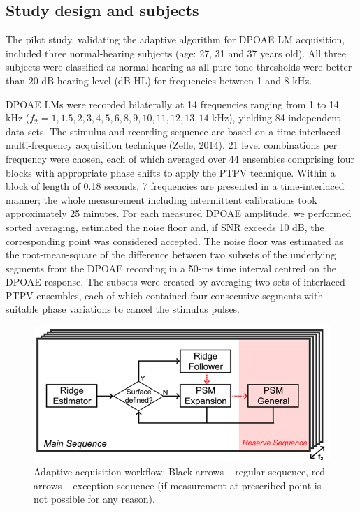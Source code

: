\documentclass[journal,twoside,web]{ieeecolor2}
\begin{document}
\subsection{Study design and subjects}

The pilot study, validating the adaptive algorithm for DPOAE LM acquisition, included three normal-hearing subjects (age: 27, 31 and 37 years old).
All three subjects were classified as normal-hearing as all pure-tone thresholds were better than $20$ dB hearing level (dB HL) for frequencies between 1 and 8 kHz.

DPOAE LMs were recorded bilaterally at 14 frequencies ranging from 1 to 14 kHz ($f_2 = 1, 1.5, 2, 3, 4, 5, 6, 8, 9, 10, 11, 12, 13, 14$ kHz), yielding 84 independent data sets.
The stimulus and recording sequence are based on a time-interlaced multi-frequency acquisition technique (Zelle, 2014).
21 level combinations per frequency were chosen, each of which averaged over 44 ensembles comprising four blocks with appropriate phase shifts to apply the PTPV technique.
Within a block of length of 0.18 seconds, 7 frequencies are presented in a time-interlaced manner; the whole measurement including intermittent calibrations took approximately 25 minutes.
For each measured DPOAE amplitude, we performed sorted averaging, estimated the noise floor and, if SNR exceeds 10 dB, the corresponding point was considered accepted.
The noise floor was estimated as the root-mean-square of the difference between two subsets of the underlying segments from the DPOAE recording in a 50-ms time interval centred on the DPOAE response.
The subsets were created by averaging two sets of interlaced PTPV ensembles, each of which contained four consecutive segments with suitable phase variations to cancel the stimulus pulses.


\begin{figure}[ht]
\centerline{\includegraphics[width=\columnwidth]{Fig_Sequence.png}}
\caption{Adaptive acquisition workflow: Black arrows – regular sequence, red arrows – exception sequence (if measurement at prescribed point is not possible for any reason).}
\label{fig_SQS}
\end{figure}
\end{document}
